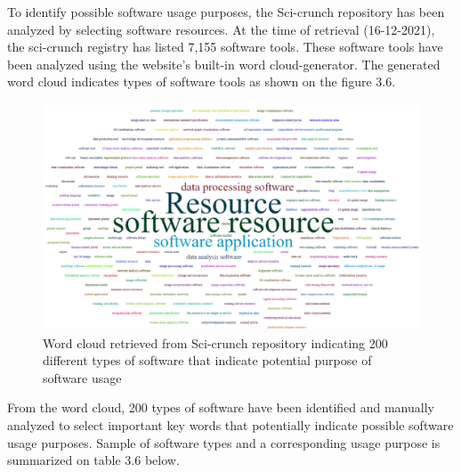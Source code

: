 To identify possible software usage purposes, the Sci-crunch repository has been analyzed by selecting software resources. At the time of retrieval (16-12-2021), the sci-crunch registry has listed 7,155 software tools. These software tools have been analyzed using the website's built-in word cloud-generator. The generated word cloud indicates types of software tools as shown on the figure 3.6.  \\
 

\begin{figure}[htbp]
	\centering
	\includegraphics[width=.80\textwidth]{4.graphics/figures/ch_3/cloud}
	\caption{Word cloud retrieved from Sci-crunch repository indicating 200 different types of software that  indicate potential purpose of software usage}
	\label{fig:chapter03:setup}
\end{figure}

From the word cloud, 200 types of software have been identified and manually analyzed to select important key words that potentially indicate possible software usage purposes. Sample of software types and a corresponding usage purpose is summarized on table 3.6 below.

